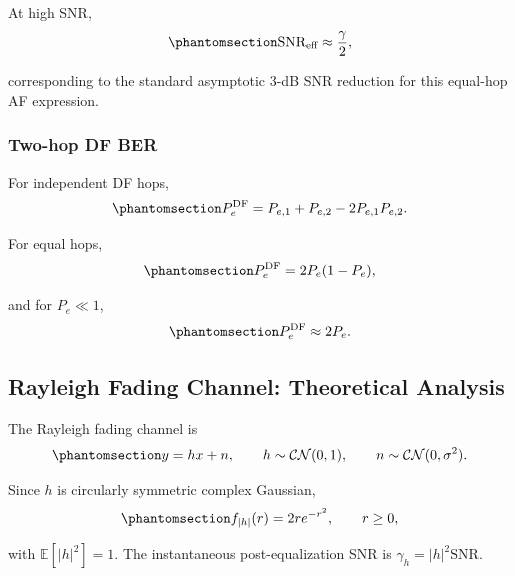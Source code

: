 At high SNR,
\begin{equation}\protect\phantomsection\label{eq:gamma-high-snr}
\text{SNR}_{\text{eff}}
\approx
\frac{\gamma}{2},
\end{equation}
corresponding to the standard asymptotic 3-dB SNR reduction for this equal-hop AF expression.

\subsubsection{Two-hop DF BER}\label{sec:awgn-two-hop-df-ber}

For independent DF hops,
\begin{equation}\protect\phantomsection\label{eq:df-ber-awgn}
P_e^{\text{DF}}
=
P_{e,1}+P_{e,2}-2P_{e,1}P_{e,2}.
\end{equation}

For equal hops,
\begin{equation}\protect\phantomsection\label{eq:equal-hop-snr}
P_e^{\text{DF}}
=
2P_e(1-P_e),
\end{equation}
and for \(P_e\ll1\),
\begin{equation}\protect\phantomsection\label{eq:df-high-snr-two-hop-penalty}
P_e^{\text{DF}}
\approx
2P_e.
\end{equation}

\subsection{Rayleigh Fading Channel: Theoretical Analysis}\label{sec:rayleigh-fading-channel-theoretical-analysis}

The Rayleigh fading channel is
\begin{equation}\protect\phantomsection\label{eq:rayleigh-channel}
y=hx+n,
\qquad
h\sim\mathcal{CN}(0,1),
\qquad
n\sim\mathcal{CN}(0,\sigma^2).
\end{equation}

Since \(h\) is circularly symmetric complex Gaussian,
\begin{equation}\protect\phantomsection\label{eq:rayleigh-pdf}
f_{|h|}(r)
=
2r e^{-r^2},
\qquad
r\geq0,
\end{equation}
with \(\mathbb{E}[|h|^2]=1\). The instantaneous post-equalization SNR is
\(\gamma_h=|h|^2\text{SNR}\).

